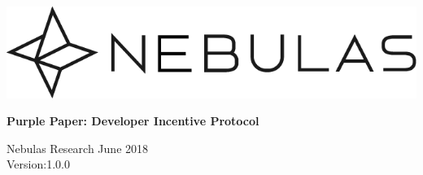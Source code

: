 \documentclass[12pt]{article}
\begin{document}
\pagestyle{empty}

\pagecolor{\pcolor}

\begin{titlepage}
  \begin{center}
    \vspace*{5.5cm}
    \includegraphics[scale=0.5]{../common/Nebulas.png}
    \vspace{0.5cm}


    \textbf{\huge{Purple Paper: Developer Incentive Protocol}}

    \vspace{0.5cm}
    Nebulas Research
    \vfill
    June 2018\\
    Version:1.0.0
    \textbf{}
  \end{center}

\end{titlepage}
\setcounter{page}{0}
\tableofcontents
\newpage
\setcounter{page}{1}
\pagestyle{fancy}
\vspace*{0.01cm}









\newpage
\begin{appendices}

%
\end{appendices}
\end{document}
